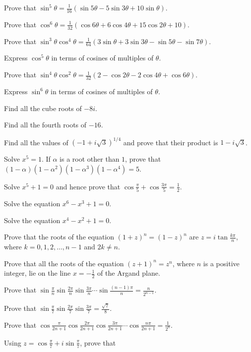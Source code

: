 \item Prove that $\sin^5\theta = \frac{1}{16}(\sin5\theta - 5\sin3\theta + 10\sin\theta)$.
\item Prove that $\cos^6\theta = \frac{1}{32}(\cos6\theta + 6\cos4\theta + 15\cos2\theta + 10)$.
\item Prove that $\sin^3\theta\cos^4\theta = \frac{1}{64}(3\sin\theta + 3\sin3\theta - \sin5\theta -
  \sin7\theta)$.
\item Express $\cos^5\theta$ in terms of cosines of multiples of $\theta$.
\item Prove that $\sin^4\theta\cos^2\theta = \frac{1}{32}(2 - \cos2\theta - 2\cos4\theta + \cos6\theta)$.
\item Express $\sin^6\theta$ in terms of cosines of multiples of $\theta$.
\item Find all the cube roots of $-8i$.
\item Find all the fourth roots of $-16$.
\item Find all the values of $(-1 + i\sqrt{3})^{1/4}$ and prove that their product is $1 - i\sqrt{3}$.
\item Solve $x^5 = 1$. If $\alpha$ is a root other than $1$, prove that $(1 - \alpha)(1 - \alpha^2)(1 -
  \alpha^3)(1 - \alpha^4) = 5$.
\item Solve $x^5 + 1 = 0$ and hence prove that $\cos\frac{\pi}{5} + \cos\frac{3\pi}{5} = \frac{1}{2}$.
\item Solve the equation $x^6 - x^3 + 1 = 0$.
\item Solve the equation $x^4 - x^2 + 1 = 0$.
\item Prove that the roots of the equation $(1 + z)^n = (1 - z)^n$ are $z = i\tan\frac{k\pi}{n}$, where $k =
  0, 1, 2, \ldots, n - 1$ and $2k\neq n$.
\item Prove that all the roots of the equation $(z + 1)^n = z^n$, where $n$ is a positive integer, lie on the
  line $x = -\frac{1}{2}$ of the Argand plane.
\item Prove that $\sin\frac{\pi}{n}\sin\frac{2\pi}{n}\sin\frac{3\pi}{n}\cdots\sin\frac{(n - 1)\pi}{n} =
  \frac{n}{2^{n - 1}}$.
\item Prove that $\sin\frac{\pi}{7}\sin\frac{2\pi}{7}\sin\frac{3\pi}{7} = \frac{\sqrt{7}}{8}$.
\item Prove that $\cos\frac{\pi}{2n + 1}\cos\frac{2\pi}{2n + 1}\cos\frac{3\pi}{2n + 1}\cdots\cos\frac{n\pi}{2n
  + 1} = \frac{1}{2^n}$.
\item Using $z = \cos\frac{\pi}{7} + i\sin\frac{\pi}{7}$, prove that

